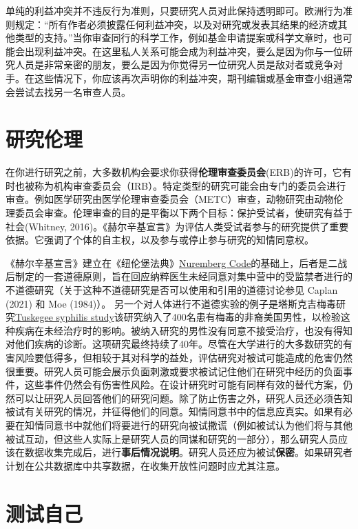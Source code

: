 \documentclass[
  letterpaper,
  DIV=11,
  numbers=noendperiod]{scrreprt}
\begin{document}
单纯的利益冲突并不违反行为准则，只要研究人员对此保持透明即可。欧洲行为准则规定：``所有作者必须披露任何利益冲突，以及对研究或发表其结果的经济或其他类型的支持。''当你审查同行的科学工作，例如基金申请提案或科学文章时，也可能会出现利益冲突。在这里私人关系可能会成为利益冲突，要么是因为你与一位研究人员是非常亲密的朋友，要么是因为你觉得另一位研究人员是敌对者或竞争对手。在这些情况下，你应该再次声明你的利益冲突，期刊编辑或基金审查小组通常会尝试去找另一名审查人员。

\hypertarget{sec-ethics}{%
\section{研究伦理}\label{sec-ethics}}

在你进行研究之前，大多数机构会要求你获得\textbf{伦理审查委员会}(ERB)的许可，它有时也被称为机构审查委员会（IRB）。特定类型的研究可能会由专门的委员会进行审查。例如医学研究由医学伦理审查委员会（METC）审查，动物研究由动物伦理委员会审查。伦理审查的目的是平衡以下两个目标：保护受试者，使研究有益于社会(Whitney,
2016)。《赫尔辛基宣言》为评估人类受试者参与的研究提供了重要依据。它强调了个体的自主权，以及参与或停止参与研究的知情同意权。

《赫尔辛基宣言》建立在《纽伦堡法典》\href{https://en.wikipedia.org/wiki/Nuremberg_Code}{Nuremberg
Code}的基础上，后者是二战后制定的一套道德原则，旨在回应纳粹医生未经同意对集中营中的受监禁者进行的不道德研究（关于这种不道德研究是否可以使用和引用的道德讨论参见
Caplan (2021) 和 Moe (1984)）。
另一个对人体进行不道德实验的例子是塔斯克吉梅毒研究\href{https://en.wikipedia.org/wiki/Tuskegee_Syphilis_Study}{Tuskegee
syphilis
study}该研究纳入了400名患有梅毒的非裔美国男性，以检验这种疾病在未经治疗时的影响。被纳入研究的男性没有同意不接受治疗，也没有得知对他们疾病的诊断。这项研究最终持续了40年。尽管在大学进行的大多数研究的有害风险要低得多，但相较于其对科学的益处，评估研究对被试可能造成的危害仍然很重要。研究人员可能会展示负面刺激或要求被试记住他们在研究中经历的负面事件，这些事件仍然会有伤害性风险。在设计研究时可能有同样有效的替代方案，仍然可以让研究人员回答他们的研究问题。除了防止伤害之外，研究人员还必须告知被试有关研究的情况，并征得他们的同意。知情同意书中的信息应真实。如果有必要在知情同意书中就他们将要进行的研究向被试撒谎（例如被试认为他们将与其他被试互动，但这些人实际上是研究人员的同谋和研究的一部分），那么研究人员应该在数据收集完成后，进行\textbf{事后情况说明}。研究人员还应为被试\textbf{保密}。如果研究者计划在公共数据库中共享数据，在收集开放性问题时应尤其注意。

\hypertarget{ux6d4bux8bd5ux81eaux5df1}{%
\section{测试自己}\label{ux6d4bux8bd5ux81eaux5df1}}
\end{document}

